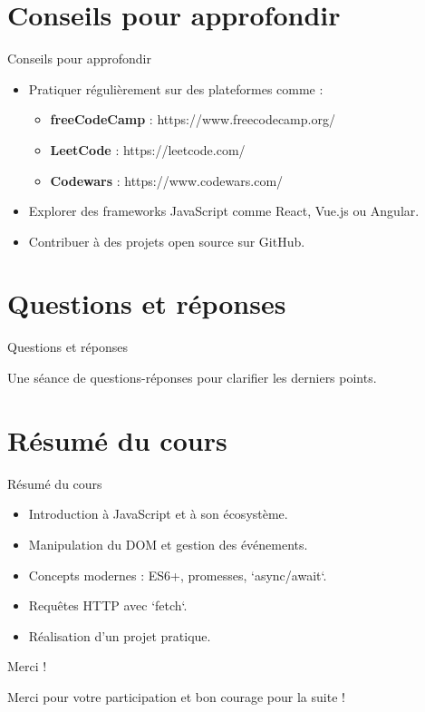 \documentclass{beamer}
\begin{document}
    \section{Conseils pour approfondir}
    \begin{frame}{Conseils pour approfondir}
    \begin{itemize}
        \item Pratiquer régulièrement sur des plateformes comme :
            \begin{itemize}
                \item \textbf{freeCodeCamp} : https://www.freecodecamp.org/
                \item \textbf{LeetCode} : https://leetcode.com/
                \item \textbf{Codewars} : https://www.codewars.com/
            \end{itemize}
        \item Explorer des frameworks JavaScript comme React, Vue.js ou Angular.
        \item Contribuer à des projets open source sur GitHub.
    \end{itemize}
    \end{frame}
    
    \section{Questions et réponses}
    \begin{frame}{Questions et réponses}
    \begin{center}
    \Large Une séance de questions-réponses pour clarifier les derniers points.
    \end{center}
    \end{frame}
    
    \section{Résumé du cours}
    \begin{frame}{Résumé du cours}
    \begin{itemize}
        \item Introduction à JavaScript et à son écosystème.
        \item Manipulation du DOM et gestion des événements.
        \item Concepts modernes : ES6+, promesses, `async/await`.
        \item Requêtes HTTP avec `fetch`.
        \item Réalisation d'un projet pratique.
    \end{itemize}
    \end{frame}
    
    \begin{frame}{Merci !}
    \begin{center}
    \Large Merci pour votre participation et bon courage pour la suite !
    \end{center}
    \end{frame}
    
\end{document}
